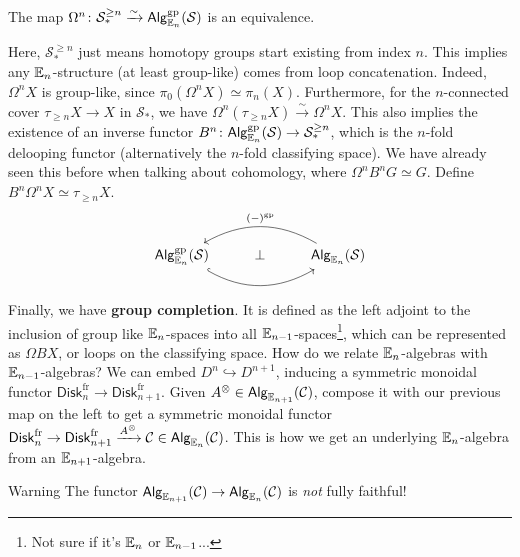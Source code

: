    \begin{theorem}
       The map $\Omega^n \colon \mathcal{S} _* ^{\geq n} \xrightarrow{\sim} \mathsf{Alg} _{\mathbb{E}_n }^{\mathrm{gp}}(\mathcal{S} )$ is an equivalence. 
       
   \end{theorem}
   Here, $\mathcal{S} _* ^{\geq n}$ just means homotopy groups start existing from index $n$. This implies any $\mathbb{E}_n $-structure (at least group-like) comes from loop concatenation. Indeed, $\Omega^n X$ is group-like, since $\pi_0 (\Omega^n X) \simeq  \pi _n (X)$. Furthermore, for the $n$-connected cover $\tau _{\geq n}X \to X$ in $\mathcal{S} _*$, we have $\Omega^n (\tau _{\geq n}X) \xrightarrow{\sim} \Omega^n X$. This also implies the existence of an inverse functor $B^n  \colon  \mathsf{Alg} _{\mathbb{E}_n }^{\mathrm{gp}}(\mathcal{S} ) \to \mathcal{S} _* ^{\geq n}$, which is the $n$-fold delooping functor (alternatively the $n$-fold classifying space). We have already seen this before when talking about cohomology, where $\Omega^n B^n G \simeq G$. Define $B^n \Omega^n X \simeq \tau _{\geq n}X$. \[
   \begin{tikzcd}
       \mathsf{Alg} _{\E_n }^{\mathrm{gp}}(\mathcal{S} )  \arrow[rr, hook,  bend right]& \perp & \mathsf{Alg} _{\E_n }(\mathcal{S} ) \arrow[ll, "(-)^{\mathrm{gp}}"',bend right]
\end{tikzcd}
   \] 
   Finally, we have \textbf{group completion}. It is defined as the left adjoint to the inclusion of group like $\mathbb{E}_n $-spaces into all $\mathbb{E} _{n-1}  $-spaces\footnote{Not sure if it's $\mathbb{E}_n $ or $\mathbb{E}_{n-1}$...}, which can be represented as $\Omega BX$, or loops on the classifying space. How do we relate $\mathbb{E}_n $-algebras with $\mathbb{E}_{n-1}$-algebras? We can embed $D^n  \hookrightarrow D^{n+1}$, inducing a symmetric monoidal functor $\mathsf{Disk} _n ^{\mathrm{fr}}\to  \mathsf{Disk} _{n+1}^{\mathrm{fr}}$. Given $A^{\otimes} \in  \mathsf{Alg} _{\mathbb{E}_{n+1}}(\mathcal{C} )$, compose it with our previous map on the left to get a symmetric monoidal functor $\mathsf{Disk}_n ^{\mathrm{fr}} \to \mathsf{Disk} _{n+1}^{\mathrm{fr}}\xrightarrow{A^{\otimes}} \mathcal{C} \in \mathsf{Alg} _{\mathbb{E}_n }(\mathcal{C} )  $. This is how we get an underlying $\mathbb{E}_n $-algebra from an $\mathbb{E}_{n+1}$-algebra.

   \begin{namedthing}{Warning} 
       The functor $\mathsf{Alg} _{\mathbb{E}_{n+1}}(\mathcal{C} ) \to \mathsf{Alg} _{\mathbb{E}_n }(\mathcal{C} )$ is \emph{not} fully faithful!
   \end{namedthing}

